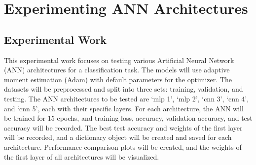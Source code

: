 \documentclass[3p,times,procedia]{elsarticle}
\begin{document}
\section{\textbf{Experimenting ANN Architectures}}

\subsection{\textbf{Experimental Work}}

This experimental work focuses on testing various Artificial Neural Network (ANN) architectures for a classification task. The models will use adaptive moment estimation (Adam) with default parameters for the optimizer. The datasets will be preprocessed and split into three sets: training, validation, and testing. The ANN architectures to be tested are ‘mlp 1’, ‘mlp 2’, ‘cnn 3’, ‘cnn 4’, and ‘cnn 5’, each with their specific layers.
For each architecture, the ANN will be trained for 15 epochs, and training loss, accuracy, validation accuracy, and test accuracy will be recorded. The best test accuracy and weights of the first layer will be recorded, and a dictionary object will be created and saved for each architecture.
Performance comparison plots will be created, and the weights of the first layer of all architectures will be visualized.

\end{document}
